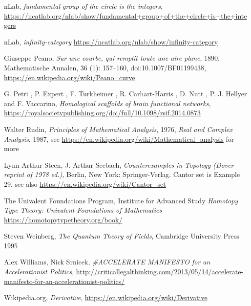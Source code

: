\documentclass{article}
\begin{document}
\begin{thebibliography}{99}
 nLab, \textit{fundamental group of the circle is the integers}, \url{https://ncatlab.org/nlab/show/fundamental+group+of+the+circle+is+the+integers}

 nLab, \textit{infinity-category} \url{https://ncatlab.org/nlab/show/infinity-category}

 Giuseppe Peano, \textit{Sur une courbe, qui remplit toute une aire plane}, 1890, Mathematische Annalen, 36 (1): 157–160, doi:10.1007/BF01199438, \url{https://en.wikipedia.org/wiki/Peano_curve}

 G. Petri , P. Expert , F. Turkheimer , R. Carhart-Harris , D. Nutt , P. J. Hellyer and F. Vaccarino, \textit{Homological scaffolds of brain functional networks}, \url{https://royalsocietypublishing.org/doi/full/10.1098/rsif.2014.0873}

 Walter Rudin, \textit{Principles of Mathematical Analysis}, 1976, \textit{Real and Complex Analysis}, 1987, see \url{https://en.wikipedia.org/wiki/Mathematical_analysis} for more

 Lynn Arthur Steen, J. Arthur Seebach, \textit{Counterexamples in Topology (Dover reprint of 1978 ed.)}, Berlin, New York: Springer-Verlag. Cantor set is Example 29, see also \url{https://en.wikipedia.org/wiki/Cantor_set}


 The Univalent Foundations Program,
Institute for Advanced Study \textit{Homotopy Type Theory:
Univalent Foundations of Mathematics} \url{https://homotopytypetheory.org/book/}

 Steven Weinberg, \textit{The Quantum Theory of Fields}, Cambridge University Press 1995

 Alex Williams, Nick Srnicek, \textit{\#ACCELERATE MANIFESTO for an Accelerationist Politics}, \url{http://criticallegalthinking.com/2013/05/14/accelerate-manifesto-for-an-accelerationist-politics/}



 Wikipedia.org, \textit{Derivative}, \url{https://en.wikipedia.org/wiki/Derivative}

\end{thebibliography}
\end{document}
